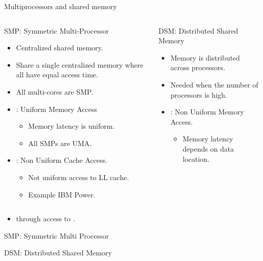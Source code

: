 \begin{frame}[t,shrink=10]{Multiprocessors and shared memory}

\vspace{-1em}
\begin{columns}[T]


\begin{block}{SMP: Symmetric Multi-Processor}
\begin{itemize}
  \item Centralized shared memory.
  \item Share a single centralized memory where all have equal access time.
  \item All multi-cores are SMP.
  \item {}: Uniform Memory Access
    \begin{itemize}
      \item Memory latency is uniform.
      \item All SMPs are UMA.
    \end{itemize}
  \item {}: Non Uniform Cache Access.
    \begin{itemize}
      \item Not uniform access to LL cache.
      \item Example IBM Power.
    \end{itemize} 
\end{itemize}
\end{block}

\pause
{}

\begin{block}{DSM: Distributed Shared Memory}
\begin{itemize}
  \item Memory is distributed across processors.
  \item Needed when the number of processors is high.
  \item {}: Non Uniform Memory Access.
    \begin{itemize}
      \item Memory latency depends on data location.
    \end{itemize}
\end{itemize}
\end{block}

\end{columns}


\begin{itemize}
  \item {} through access to .
\end{itemize}
\end{frame}

\begin{frame}[t]{SMP: Symmetric Multi Processor}
\makebox[\textwidth][c]{}
\end{frame}

\begin{frame}[t]{DSM: Distributed Shared Memory}
\makebox[\textwidth][c]{}
\end{frame}
